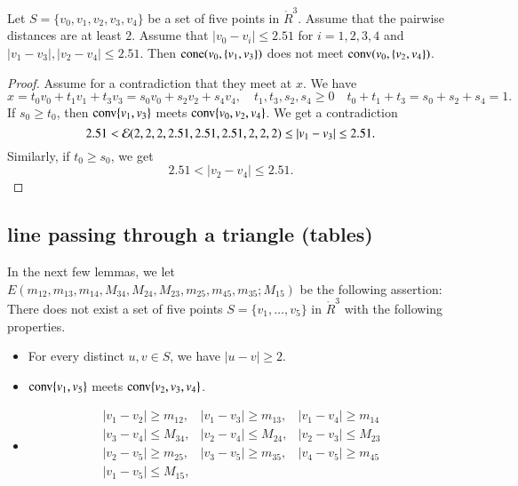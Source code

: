 \newpage

\begin{lemma}
Let $S=\{v_0,v_1,v_2,v_3,v_4\}$ be a set of five points in
$\ring{R}^3$.  Assume that the pairwise distances are at least $2$.
Assume  that $|v_0-v_i|\le 2.51$ for $i=1,2,3,4$ and
$|v_1-v_3|,|v_2-v_4|\le 2.51$. Then
${\operatorname{cone}}(v_0,\{v_1,v_3\})$ does not meet
${\operatorname{conv}}(v_0,\{v_2,v_4\})$.
\end{lemma}

\begin{proof} Assume for a contradiction that they meet at $x$.
We have
  $$x = t_0 v_0 + t_1 v_1 + t_3 v_3 = s_0 v_0 + s_2 v_2 + s_4 v_4,
  \quad t_1,t_3,s_2,s_4\ge0\quad t_0+t_1+t_3=s_0+s_2+s_4=1.
  $$
If $s_0\ge t_0$, then ${\operatorname{conv}}\{v_1,v_3\}$ meets 
${\operatorname{conv}}\{v_0,v_2,v_4\}$.  
We get a
contradiction
    $$2.51 < {\mathcal E}(2,2,2,2.51,2.51,2.51,2,2,2) \le |v_1-v_3|\le 2.51.$$
Similarly, if $t_0\ge s_0$, we get
    $$2.51 < |v_2-v_4|\le 2.51.$$
\end{proof}

\newpage
\subsection{line passing through a triangle (tables)}




In the next few lemmas, we let
$E(m_{12},m_{13},m_{14},M_{34},M_{24},M_{23},m_{25},m_{45},m_{35};M_{15})$ 
be the following assertion:
There does not exist a set of five points $S=\{v_1,\ldots,v_5\}$ in
$\ring{R}^3$ with the following properties.
\begin{itemize}
  \item For every distinct $u,v\in S$, we have $|u-v|\ge 2$.
    \item ${\operatorname{conv}}\{v_1,v_5\}$ meets ${\operatorname{conv}}\{v_2,v_3,v_4\}$.
  \item $$
    \begin{array}{lll}
      |v_1-v_2|\ge m_{12}, &|v_1-v_3|\ge m_{13}, &|v_1-v_4|\ge m_{14}\\
      |v_3-v_4|\le M_{34}, &|v_2-v_4|\le M_{24}, &|v_2-v_3|\le M_{23}\\
      |v_2-v_5|\ge m_{25}, &|v_3-v_5|\ge m_{35}, &|v_4-v_5|\ge m_{45}\\
      |v_1-v_5|\le M_{15},\\
      \end{array}
    $$
\end{itemize}

